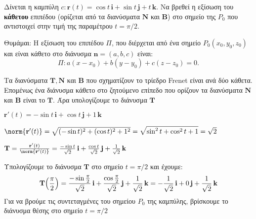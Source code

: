 \documentclass[a4paper,table]{report}
\begin{document}
\begin{mybox3}
  \begin{thema}
    Δίνεται η καμπύλη $ c: \mathbf{r}(t)= \cos{t}\, \mathbf{i} + \sin{t}\, \mathbf{j} + t
    \, \mathbf{k}$. Να βρεθεί η εξίσωση του \textbf{κάθετου} επιπέδου (ορίζεται από τα 
    διανύσματα $ \mathbf{N} $ και $ \mathbf{B} $) στο σημείο της $ P_{0} $ που 
    αντιστοιχεί στην τιμή της παραμέτρου $ t= {\pi}/{2} $.
  \end{thema}
\end{mybox3}
\begin{solution}
  \item {}
    \begin{mybox1}
    \item {}
      \textcolor{Col1}{Θυμάμαι:} Η εξίσωση του επιπέδου $ \Pi $, που διέρχεται από ένα 
      σημείο $ P_{0}(x_{0}, y_{0}, z_{0}) $ και είναι κάθετο στο διάνυσμα 
      $ \mathbf{n} = (a,b,c) $ είναι:
      \[
        \Pi: a(x- x_{0}) + b(y- y_{0}) + c(z- z_{0}) = 0. 
      \] 
    \end{mybox1}
    Τα διανύσματα $ \mathbf{T}, \mathbf{N} $ και $ \mathbf{B} $ που σχηματίζουν το τρίεδρο
    Frenet είναι ανά δύο κάθετα. Επομένως ένα διάνυσμα κάθετο στο ζητούμενο επίπεδο που 
    ορίζουν τα διανύσματα $ \mathbf{N} $ και $ \mathbf{B} $ είναι το $ \mathbf{T} $. Άρα 
    υπολογίζουμε το διάνυσμα $ \mathbf{T} $ 
    \begin{myitemize}
      \item $ \mathbf{r'}(t)=- \sin{t}\, \mathbf{i} + \cos{t}\, \mathbf{j} + 1 \, \mathbf{k} $
      \item $ \norm{\mathbf{r'}(t)} = \sqrt{(- \sin{t} )^{2} + (\cos{t} )^{2} + 1^{2}} =
        \sqrt{\sin^{2}{t} + \cos^{2}{t} + 1} = \sqrt{2} $ 
      \item $ \mathbf{T}= \frac{\mathbf{r'}(t)}{\norm{\mathbf{r'}(t)}} =
        \frac{- \sin{t}}{\sqrt{2}}\,\mathbf{i}
        + \frac{\cos{t}}{\sqrt{2}}\,\mathbf{j} + \frac{1}{\sqrt{2}}\,\mathbf{k} $
    \end{myitemize}
    Υπολογίζουμε το διάνυσμα $ \mathbf{T} $ στο σημείο $ t = \pi /2 $ και έχουμε:
    \[
      \mathbf{T}\Bigl(\frac{\pi}{2}\Bigr) =  \frac{- \sin{\frac{\pi}{2}
      }}{\sqrt{2}}\,\mathbf{i} +
      \frac{\cos{\frac{\pi}{2}}}{\sqrt{2}}\,\mathbf{j} + \frac{1}{\sqrt{2}}\,\mathbf{k} = 
      - \frac{1}{\sqrt{2}}\,\mathbf{i} + 0\,\mathbf{j} + \frac{1}{\sqrt{2}}\,\mathbf{k}
    \]
    Για να βρούμε τις συντεταγμένες του σημείου $ P_{0} $ της καμπύλης, βρίσκουμε το 
    διάνυσμα θέσης στο σημείο $ t = \pi /2 $

\end{solution}
\end{document}
